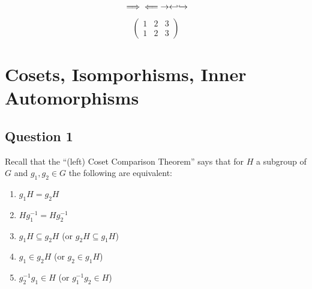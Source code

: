 \documentclass[openany]{report}
\begin{document}
$$\implies \impliedby \rightarrow \hookleftarrow \xhookrightarrow{}$$

$$\begin{pmatrix}
1 & 2 & 3\\
1 & 2 & 3
\end{pmatrix}$$

\chapter{Cosets, Isomporhisms, Inner Automorphisms}
\section{Question 1}
Recall that the “(left) Coset Comparison Theorem” says that for $H$ a subgroup of $G$ and $g_1, g_2 \in G$ the following are equivalent:
\begin{enumerate}[label=(\alph*)]
    \item $g_1H = g_2H$
    \item $Hg_1^{-1} = Hg_2^{-1}$
    \item $g_1H \subseteq g_2H$ (or $g_2H \subseteq g_1H$)
    \item $g_1 \in g_2H$ (or $g_2 \in g_1H$)
    \item $g_2^{-1}g_1 \in H$ (or $g_1^{-1}g_2 \in H$)
\end{enumerate}
\end{document}
